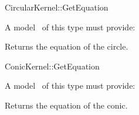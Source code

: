 \begin{ccRefConcept}{CircularKernel::GetEquation}

\ccDefinition


A model \ccVar\ of this type must provide:

{Returns the equation of the circle.}

\ccHasModels


\end{ccRefConcept}
\begin{ccRefConcept}{ConicKernel::GetEquation}

\ccDefinition


A model \ccVar\ of this type must provide:

{Returns the equation of the conic.}

\ccHasModels


\end{ccRefConcept}
